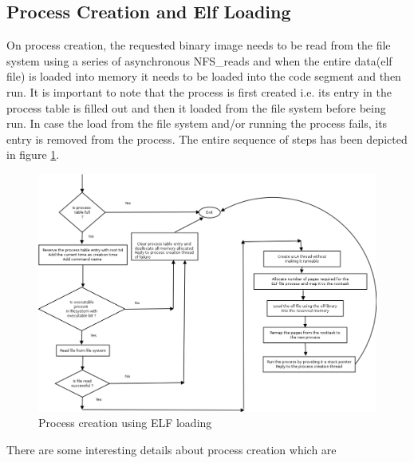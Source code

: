\documentclass[a4paper, 11pt]{article}
\begin{document}
\subsection{Process Creation and Elf Loading}
On process creation, the requested binary image needs to be read from
the file system using a series of asynchronous NFS\_reads and when the
entire data(elf file) is loaded into memory it needs to be loaded into
the code segment and then run. It is important to note that the
process is first created i.e. its entry in the process table is filled
out and then it loaded from the file system before being run. In case
the load from the file system and/or running the process fails,
its entry is removed from the process. The entire sequence of steps
has been depicted in figure \ref{elf-loading-fig}.
\begin{figure}
\begin{center}
\includegraphics[scale=0.4]{process-creation.png}
\end{center}
\caption{Process creation using ELF loading}
\label{elf-loading-fig}
\end{figure}
There are some interesting details about process creation which are
\end{document}
